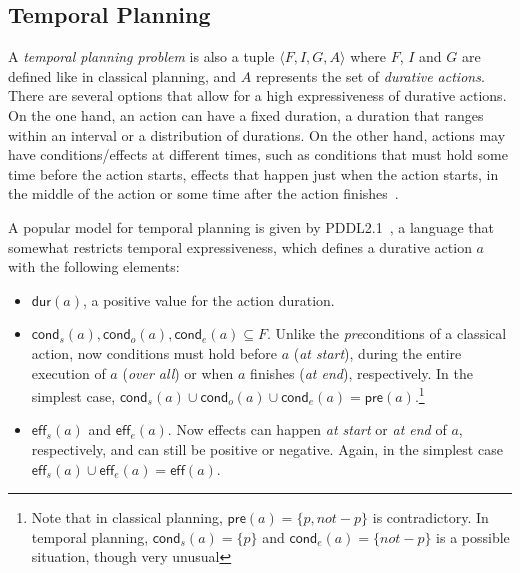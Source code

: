 \documentclass[runningheads]{llncs}
\newcommand{\tup}[1]{{\langle #1 \rangle}}
\newcommand{\pre}{\mathsf{pre}}    %
\newcommand{\eff}{\mathsf{eff}}    %
\newcommand{\cond}{\mathsf{cond}}  %
\newcommand{\dur}{\mathsf{dur}}    %
\begin{document}
\subsection{Temporal Planning}
\label{sec:temporalplanning}

A {\em temporal planning problem} is also a tuple $\tup{F,I,G,A}$ where $F$, $I$ and $G$ are defined like in classical planning, and $A$ represents the set of {\em durative actions}. There are several options that allow for a high expressiveness of durative actions. On the one hand, an action can have a fixed duration, a duration that ranges within an interval or a distribution of durations. On the other hand, actions may have conditions/effects at different times, such as conditions that must hold some time before the action starts, effects that happen just when the action starts, in the middle of the action or some time after the action finishes~\cite{garrido2009constraint}.

A popular model for temporal planning is given by PDDL2.1~\cite{fox2003pddl2}, a language that somewhat restricts temporal expressiveness, which defines a durative action $a$ with the following elements:

\begin{itemize}

\item $\dur(a)$, a positive value for the action duration.

\item $\cond_s(a), \cond_o(a), \cond_e(a) \subseteq F$. Unlike the \emph{pre}conditions of a classical action, now conditions must hold before $a$ ({\em at start}), during the entire execution of $a$ ({\em over all}) or when $a$ finishes ({\em at end}), respectively. In the simplest case, $\cond_s(a) \cup \cond_o(a) \cup \cond_e(a) = \pre(a).$\footnote{Note that in classical planning, $\pre(a)=\{p,not-p\}$ is contradictory. In temporal planning, $\cond_s(a)=\{p\}$ and $\cond_e(a)=\{not-p\}$ is a possible situation, though very unusual}


\item $\eff_s(a)$ and $\eff_e(a)$. Now effects can happen {\em at start} or {\em at end} of $a$, respectively, and can still be positive or negative. Again, in the simplest case $\eff_s(a) \cup \eff_e(a) = \eff(a)$.

\end{itemize}
\end{document}
